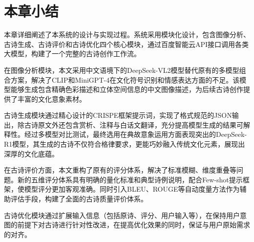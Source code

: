 

\section{本章小结}

本章详细阐述了本系统的设计与实现过程。系统采用模块化设计，包含图像分析、古诗生成、古诗评价和古诗优化四个核心模块，通过百度智能云API接口调用各类大模型，构建了一个完整的古诗创作工作流。

在图像分析模块，本文采用中文语境下的DeepSeek-VL2模型替代原有的多模型组合方案，解决了CLIP和MiniGPT-4在文化符号识别和情感表达方面的不足。该模型能够生成包含精确色彩描述和立体空间信息的中文图像描述，为后续古诗创作提供了丰富的文化意象素材。

古诗生成模块通过精心设计的CRISPE框架提示词，实现了格式规范的JSON输出，除古诗原文外还包含赏析、注释与白话文翻译，充分提高模型生成的结果可解释性。经过多模型对比测试，最终选用在典故意象运用方面表现突出的DeepSeek-R1模型，其生成的古诗不仅符合格律要求，更能巧妙融入传统文化元素，展现出深厚的文化底蕴。

在古诗评价方面，本文重构了原有的评分体系，解决了标准模糊、维度重叠等问题。新的五维评分体系具有明确的量化标准和典型诗例说明，配合Few-shot提示框架，使模型评分更加客观准确。同时引入BLEU、ROUGE等自动度量方法作为辅助评估手段，构建了全面的古诗质量评价体系。

古诗优化模块通过扩展输入信息（包括原诗、评分、用户输入等），在保持用户意图的前提下对古诗进行针对性改进，在提高优化效果的同时，保证与用户原始需求的对齐。
